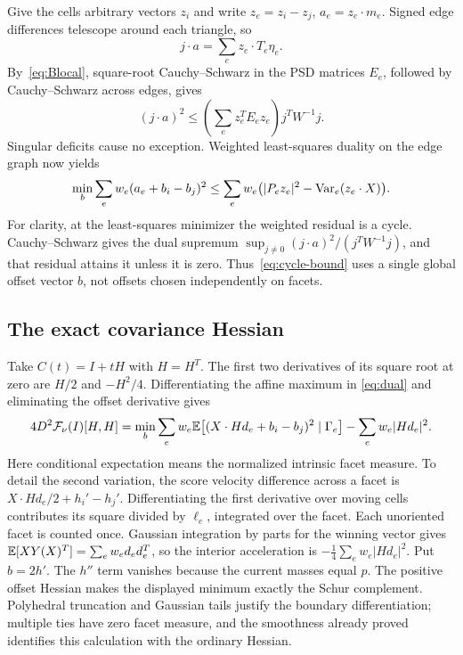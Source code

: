 Give the cells arbitrary vectors $z_i$ and write
$z_e=z_i-z_j$, $a_e=z_e\cdot m_e$.
Signed edge differences telescope around each triangle, so
\[
 j\cdot a=\sum_e z_e\cdot T_e\eta_e.
\]
By~\eqref{eq:Blocal}, square-root Cauchy--Schwarz in the PSD matrices $E_e$,
followed by Cauchy--Schwarz across edges, gives
\[
 (j\cdot a)^2\leq
 \left(\sum_e z_e^TE_ez_e\right)j^TW^{-1}j.
\]
Singular deficits cause no exception. Weighted least-squares duality on the
edge graph now yields
\begin{equation}\label{eq:cycle-bound}
 \min_b\sum_e w_e(a_e+b_i-b_j)^2
 \leq\sum_e w_e\bigl(|P_ez_e|^2-\operatorname{Var}_e(z_e\cdot X)\bigr).
\end{equation}
For clarity, at the least-squares minimizer the weighted residual is a cycle.
Cauchy--Schwarz gives the dual supremum
$\sup_{j\ne0}(j\cdot a)^2/(j^TW^{-1}j)$, and that residual attains it
unless it is zero. Thus~\eqref{eq:cycle-bound} uses a single global offset
vector $b$, not offsets chosen independently on facets.

\subsection{The exact covariance Hessian}
Take $C(t)=I+tH$ with $H=H^T$. The first two derivatives of its square root
at zero are $H/2$ and $-H^2/4$. Differentiating the affine maximum in
\eqref{eq:dual} and eliminating the offset derivative gives
\begin{equation}\label{eq:cov-Hessian}
 4D^2\mathcal F_\nu(I)[H,H]
 =\min_b\sum_e w_e\mathbb E\bigl[(X\cdot Hd_e+b_i-b_j)^2\mid\Gamma_e\bigr]
       -\sum_e w_e|Hd_e|^2.
\end{equation}
Here conditional expectation means the normalized intrinsic facet measure.
To detail the second variation, the score velocity difference across a facet
is $X\cdot Hd_e/2+h_i'-h_j'$. Differentiating the first derivative over moving
cells contributes its square divided by $\ell_e$, integrated over the facet.
Each unoriented facet is counted once. Gaussian integration by parts for the
winning vector gives
$\mathbb E[XY(X)^T]=\sum_e w_ed_ed_e^T$, so the interior acceleration is
$-\frac14\sum_e w_e|Hd_e|^2$. Put $b=2h'$.
The $h''$ term vanishes because the current masses equal $p$.
The positive offset Hessian makes the displayed minimum exactly the Schur
complement. Polyhedral truncation and Gaussian tails justify the boundary
differentiation; multiple ties have zero facet measure, and the smoothness
already proved identifies this calculation with the ordinary Hessian.

